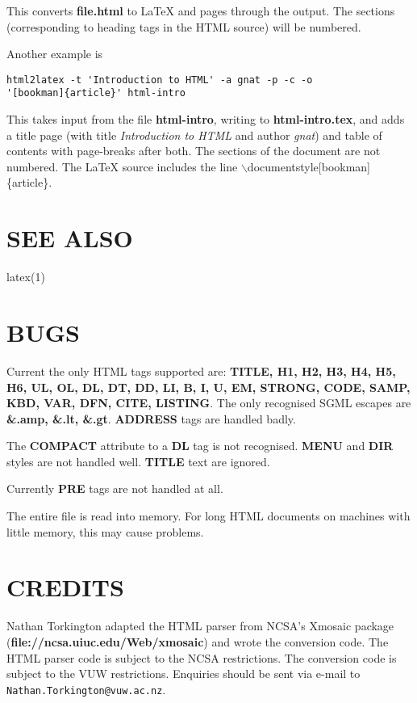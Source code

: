 This converts {\bf file.html} to LaTeX and pages through the
output.  The sections (corresponding to heading tags in the HTML
source) will be numbered.
\par 
Another example is
\begin{verbatim}html2latex -t 'Introduction to HTML' -a gnat -p -c -o
'[bookman]{article}' html-intro
\end{verbatim}
This takes input from the file {\bf html-intro}, writing to
{\bf html-intro.tex}, and adds a title page (with title
{\it Introduction to HTML} and author {\it gnat})
and table of contents with page-breaks after both.  The sections of
the document are not numbered.  The LaTeX source includes the line
$\backslash$documentstyle[bookman]\{article\}.
\section*{SEE ALSO}
latex(1)
\section*{BUGS}
Current the only HTML tags supported are: {\bf TITLE, H1, H2, H3, H4, H5,
H6, UL, OL, DL, DT, DD, LI, B, I, U, EM, STRONG, CODE, SAMP, KBD, VAR,
DFN, CITE, LISTING}.  The only recognised SGML escapes are {\bf \&.amp,
\&.lt, \&.gt}.  {\bf ADDRESS} tags are handled badly.
\par 
The {\bf COMPACT} attribute to a {\bf DL} tag is not recognised.
{\bf MENU} and {\bf DIR} styles are not handled well.
{\bf TITLE} text are ignored.
\par 
Currently {\bf PRE} tags are not handled at all.
\par 
The entire file is read into memory.  For long HTML documents on
machines with little memory, this may cause problems.
\section*{CREDITS}
Nathan Torkington adapted the HTML parser from NCSA's Xmosaic package
({\bf file://ncsa.uiuc.edu/Web/xmosaic}) and wrote the conversion
code.  The HTML parser code is subject to the NCSA restrictions.  The
conversion code is subject to the VUW restrictions.  Enquiries should
be sent via e-mail to {\tt Nathan.Torkington@vuw.ac.nz}.

